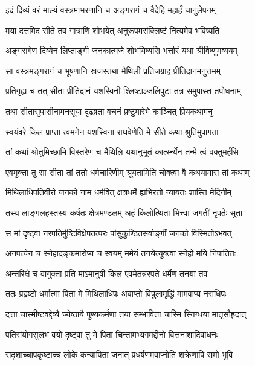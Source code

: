 \twolineshloka
{इदं दिव्यं वरं माल्यं वस्त्रमाभरणानि च}
{अङ्गरागं च वैदेहि महार्हं चानुलेपनम्} %

\twolineshloka
{मया दत्तमिदं सीते तव गात्राणि शोभयेत्}
{अनुरूपमसंक्लिष्टं नित्यमेव भविष्यति} %

\twolineshloka
{अङ्गरागेण दिव्येन लिप्ताङ्गी जनकात्मजे}
{शोभयिष्यसि भर्त्तारं यथा श्रीविष्णुमव्ययम्} %

\twolineshloka
{सा वस्त्रमङ्गरागं च भूषणानि स्रजस्तथा}
{मैथिली प्रतिजग्राह प्रीतिदानमनुत्तमम्} %

\twolineshloka
{प्रतिगृह्य च तत् सीता प्रीतिदानं यशस्विनी}
{श्लिष्टाञ्जलिपुटा तत्र समुपास्त तपोधनाम्} %

\twolineshloka
{तथा सीतासुपासीनामनसूया दृढव्रता}
{वचनं प्रष्टुमारेभे काञ्चित् प्रियकथामनु} %

\twolineshloka
{स्वयंवरे किल प्राप्ता त्वमनेन यशस्विना}
{राघवेणेति मे सीते कथा श्रुतिमुपागता} %

\twolineshloka
{तां कथां श्रोतुमिच्छामि विस्तरेण च मैथिलि}
{यथानुभूतं कार्त्स्न्येन तन्मे त्वं वक्तुमर्हसि} %

\twolineshloka
{एवमुक्ता तु सा सीता तां ततो धर्मचारिणीम्}
{श्रूयतामिति चोक्त्वा वै कथयामास तां कथाम्} %

\twolineshloka
{मिथिलाधिपतिर्वीरो जनको नाम धर्मवित्}
{क्षत्रधर्मे ह्यभिरतो न्यायतः शास्ति मेदिनीम्} %

\twolineshloka
{तस्य लाङ्गलहस्तस्य कर्षतः क्षेत्रमण्डलम्}
{अहं किलोत्थिता भित्त्वा जगतीं नृपतेः सुता} %

\twolineshloka
{स मां दृष्ट्वा नरपतिर्मुष्टिविक्षेपतत्परः}
{पांसुकुण्ठितसर्वाङ्गीं जनको विस्मितोऽभवत्} %

\twolineshloka
{अनपत्येन च स्नेहादङ्कमारोप्य च स्वयम्}
{ममेयं तनयेत्युक्त्वा स्नेहो मयि निपातितः} %

\twolineshloka
{अन्तरिक्षे च वागुक्ता प्रति माऽमानुषी किल}
{एवमेतन्नरपते धर्मेण तनया तव} %

\twolineshloka
{ततः प्रहृष्टो धर्मात्मा पिता मे मिथिलाधिपः}
{अवाप्तो विपुलामृद्धिं मामवाप्य नराधिपः} %

\twolineshloka
{दत्ता चास्मीष्टवद्देव्यै ज्येष्ठायै पुण्यकर्मणा}
{तया सम्भाविता चास्मि स्निग्धया मातृसौहृदात्} %

\twolineshloka
{पतिसंयोगसुलभं वयो दृष्ट्वा तु मे पिता}
{चिन्तामभ्यगमद्दीनो वित्तनाशादिवाधनः} %

\twolineshloka
{सदृशाच्चापकृष्टाच्च लोके कन्यापिता जनात्}
{प्रधर्षणमवाप्नोति शक्रेणापि समो भुवि} %

